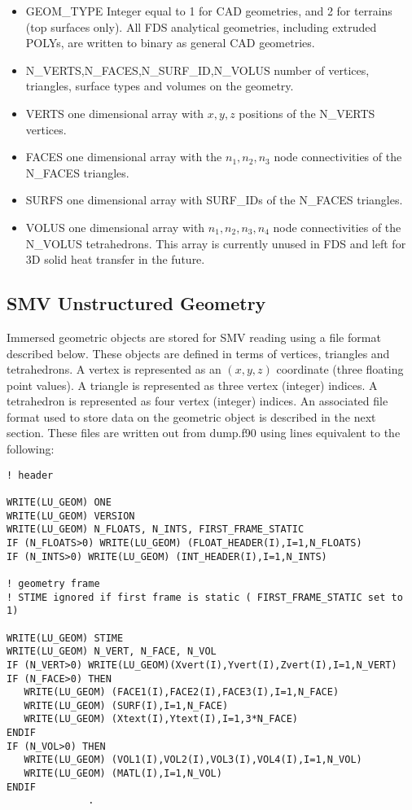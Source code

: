 \documentclass[12pt]{article}
\begin{document}
\begin{itemize}
  \item {\ct GEOM\_TYPE} Integer equal to 1 for CAD geometries, and 2 for terrains (top surfaces only). All FDS analytical geometries, including extruded POLYs, are written to binary as general CAD geometries.
  \item {\ct N\_VERTS,N\_FACES,N\_SURF\_ID,N\_VOLUS} number of vertices, triangles, surface types and volumes on the geometry.
  \item {\ct VERTS} one dimensional array with $x,y,z$ positions of the {\ct N\_VERTS} vertices.
  \item {\ct FACES} one dimensional array with the $n_1,n_2,n_3$ node connectivities of the {\ct N\_FACES} triangles.
  \item {\ct SURFS} one dimensional array with {\ct SURF\_ID}s of the {\ct N\_FACES} triangles.
  \item {\ct VOLUS} one dimensional array with $n_1,n_2,n_3,n_4$ node connectivities of the {\ct N\_VOLUS} tetrahedrons. This array is currently unused in FDS and left for 3D solid heat transfer in the future.
\end{itemize}


\subsection{SMV Unstructured Geometry}
\label{out:GEOMETRY}

Immersed geometric objects are stored for SMV reading using a file format described below.
These objects are defined in terms of vertices, triangles and tetrahedrons.
A vertex is represented as an $(x,y,z)$ coordinate (three floating point values).
A triangle is represented as three vertex (integer) indices. A tetrahedron is represented as four vertex (integer) indices.
An associated file format used to store data  on the geometric object is described in the next section.
These files are written out from {\ct dump.f90} using lines equivalent to the following:

\begin{lstlisting}
! header

WRITE(LU_GEOM) ONE
WRITE(LU_GEOM) VERSION
WRITE(LU_GEOM) N_FLOATS, N_INTS, FIRST_FRAME_STATIC
IF (N_FLOATS>0) WRITE(LU_GEOM) (FLOAT_HEADER(I),I=1,N_FLOATS)
IF (N_INTS>0) WRITE(LU_GEOM) (INT_HEADER(I),I=1,N_INTS)

! geometry frame
! STIME ignored if first frame is static ( FIRST_FRAME_STATIC set to 1)

WRITE(LU_GEOM) STIME
WRITE(LU_GEOM) N_VERT, N_FACE, N_VOL
IF (N_VERT>0) WRITE(LU_GEOM)(Xvert(I),Yvert(I),Zvert(I),I=1,N_VERT)
IF (N_FACE>0) THEN
   WRITE(LU_GEOM) (FACE1(I),FACE2(I),FACE3(I),I=1,N_FACE)
   WRITE(LU_GEOM) (SURF(I),I=1,N_FACE)
   WRITE(LU_GEOM) (Xtext(I),Ytext(I),I=1,3*N_FACE)
ENDIF
IF (N_VOL>0) THEN
   WRITE(LU_GEOM) (VOL1(I),VOL2(I),VOL3(I),VOL4(I),I=1,N_VOL)
   WRITE(LU_GEOM) (MATL(I),I=1,N_VOL)
ENDIF
              .
\end{lstlisting}
\end{document}
